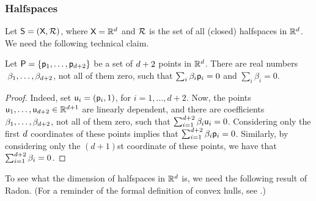 \subsubsection{Halfspaces}
Let $\mathsf{S} = (\textsf{X},{\mathcal{R}})$, where
$\textsf{X}=\mathbb{R}^d$ and ${\mathcal{R}}$ is the set of all (closed)
halfspaces in $\mathbb{R}^d$.  We need the following technical claim.

\begin{claim}
    Let ${\mathsf{P}} = \left\{ {\mathsf{p}_1, \ldots, \mathsf{p}_{d+2}} \right\}$ be a set of
    $d+2$ points in $\mathbb{R}^d$.  There are real numbers
    $\;\beta_1, \ldots, \beta_{d+2}$, not all of them zero, such
    that $\sum_i \beta_i \mathsf{p}_i = 0$ and $\sum_i \beta_i = 0$.
\end{claim}

\begin{proof} %
    Indeed, set $\pntA_i = \pth[]{\pnt_i, 1}$, for $i=1,\ldots,
    d+2$. Now, the points $\mathsf{u}_1, \ldots, \mathsf{u}_{d+2} \in
    \mathbb{R}^{d+1}$ are linearly dependent, and there are coefficients
    $\beta_1, \ldots, \beta_{d+2}$, not all of them zero, such
    that $\sum_{i=1}^{d+2} \beta_i \mathsf{u}_i = 0$.  Considering only
    the first $d$ coordinates of these points implies that
    $\sum_{i=1}^{d+2} \beta_i \mathsf{p}_i = 0$. Similarly, by
    considering only the $(d+1)$st coordinate of these points, we have
    that $\sum_{i=1}^{d+2} \beta_i = 0$.
\end{proof}


To see what the \VC dimension of halfspaces in $\mathbb{R}^d$ is, we need
the following result of Radon. (For a reminder of the formal
definition of convex hulls, see .)

